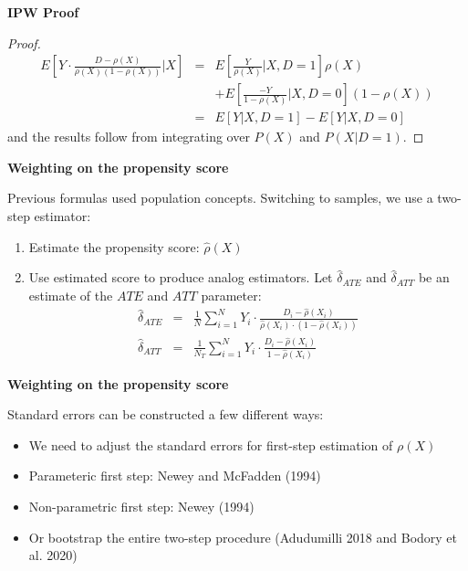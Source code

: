 \documentclass[notes=show]{beamer}
\begin{document}
\begin{frame}[plain,shrink=5]
\begin{center}
\textbf{IPW Proof}
\end{center}

	\begin{proof}
	\begin{eqnarray*}
	E \left[ Y \cdot \frac{D-\rho(X)}{\rho(X)(1-\rho(X))} \Big\vert X \right] &=& E \left[ \frac{Y}{\rho(X)} \Big\vert X,D=1 \right] \rho(X) \\
	&& + E\left[ \frac{-Y}{1-\rho(X)} \Big\vert X,D=0 \right](1-\rho(X)) \\
	&=& E[Y|X,D=1] - E[Y|X,D=0]
	\end{eqnarray*}and the results follow from integrating over $P(X)$ and $P(X|D=1)$.
	\end{proof}

\end{frame}


\begin{frame}[plain]
	\begin{center}
	\textbf{Weighting on the propensity score}
	\end{center}

Previous formulas used population concepts. Switching to samples, we use a two-step estimator:
	\begin{enumerate}
	\item Estimate the propensity score: $\widehat{\rho}(X)$
	\item Use estimated score to produce analog estimators. Let $\widehat{\delta}_{ATE}$ and $\widehat{\delta}_{ATT}$  be an estimate of the $ATE$ and $ATT$ parameter:
		\begin{eqnarray*}
		\widehat{\delta}_{ATE} &=& \frac{1}{N} \sum_{i=1}^N Y_i \cdot \frac{D_i - \widehat{\rho}(X_i)}{\widehat{\rho}(X_i) \cdot (1-\widehat{\rho}(X_i))}\\
		\widehat{\delta}_{ATT} &=& \frac{1}{N_T} \sum_{i=1}^N Y_i \cdot \frac{D_i - \widehat{\rho}(X_i)}{1-\widehat{\rho}(X_i)}
		\end{eqnarray*}
	\end{enumerate}
\end{frame}

\begin{frame}[plain]
	\begin{center}
	\textbf{Weighting on the propensity score}
	\end{center}
	
		
Standard errors can be constructed a few different ways:
	\begin{itemize}
	\item We need to adjust the standard errors for first-step estimation of $\rho(X)$
	\item Parameteric first step: Newey and McFadden (1994)
	\item Non-parametric first step: Newey (1994)
	\item Or bootstrap the entire two-step procedure (Adudumilli 2018 and Bodory et al. 2020)
	\end{itemize}
\end{frame}
\end{document}
